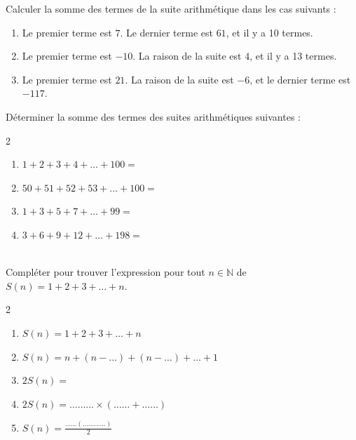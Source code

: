 \documentclass[main.tex]{subfiles}
\begin{document}
\begin{exercise}\label{chapter05:exercise:suites37}  Calculer la somme des termes de la suite arithmétique dans les cas suivants :
\begin{enumerate}[leftmargin=*,label=\arabic*)]
	\item Le premier terme est $7$. Le dernier terme est $61$, et il y a 10 termes.
	\item Le premier terme est $-10$. La raison de la suite est $4$, et il y a 13 termes.
	\item Le premier terme est $21$. La raison de la suite est $-6$, et le dernier terme est $-117$.
\end{enumerate} 
\end{exercise}
\begin{exercise}\label{chapter05:exercise:suites54} Déterminer la somme des termes des suites arithmétiques suivantes :
\begin{spacing}{2}
	\vspace{-0.5em}
	\begin{enumerate}[leftmargin=*,label=\arabic*)]
		\item $1+2+3+4+\ldots +100=$\dotfill 
		\item $50+51+52+53+\ldots +100=$\dotfill 
		\item $1+3+5+7+\ldots +99 =$\dotfill 
		\item $3+6+9+12+\ldots + 198=$\dotfill 
	\end{enumerate}
\end{spacing}
\vspace{-0.75em}
\end{exercise} 
\begin{exercise}\label{chapter05:exercise:suites38} \hfill \\
Compléter pour trouver l'expression pour tout $n\in\mathbb{N}$ de $S(n)=1+2+3+\ldots+n$. 
\begin{spacing}{2}
	\vspace{-0.5em}
	\begin{enumerate}[leftmargin=*,label={}]
		\item  $S(n)=1+2+3+\ldots + n$
		\item $S(n)= n + (n-\ldots) + (n-\ldots) + \ldots + 1$
		\item $2S(n)= $\dotfill 
		\item $2S(n)= \ldots\ldots\ldots \times (\ldots\ldots + \ldots \ldots)$
		\item $S(n)=\frac{\ldots\ldots (\ldots \ldots\ldots\ldots)}{2}$
	\end{enumerate}
\end{spacing}
\vspace{-0.5em}
\end{exercise}
\end{document}
